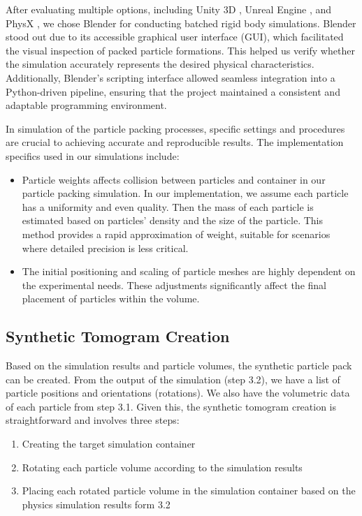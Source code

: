 \documentclass[preprint,12pt]{elsarticle}
\begin{document}
\par
After evaluating multiple options, including Unity 3D \citep{unity2024unity}, Unreal Engine \citep{unreal2024epic}, and PhysX \citep{nvidia2024nvidia}, we chose Blender \citep{blender2023objectops} for conducting batched rigid body simulations. 
Blender stood out due to its accessible graphical user interface (GUI), which facilitated the visual inspection of packed particle formations. 
This helped us verify whether the simulation accurately represents the desired physical characteristics.
Additionally, Blender's scripting interface allowed seamless integration into a Python-driven pipeline, ensuring that the project maintained a consistent and adaptable programming environment.
\par
In simulation of the particle packing processes, specific settings and procedures are crucial to achieving accurate and reproducible results. 
The implementation specifics used in our simulations include:
\begin{itemize}
    \item
    Particle weights affects collision between particles and container in our particle packing simulation. 
    In our implementation, we assume each particle has a uniformity and even quality. 
    Then the mass of each particle is estimated based on particles' density and the size of the particle.
    This method provides a rapid approximation of weight, suitable for scenarios where detailed precision is less critical. 
    \item
    The initial positioning and scaling of particle meshes are highly dependent on the experimental needs. 
    These adjustments significantly affect the final placement of particles within the volume. 
\end{itemize}
\subsection{Synthetic Tomogram Creation}
Based on the simulation results and particle volumes, the synthetic particle pack can be created. 
From the output of the simulation (step 3.2), we have a list of particle positions and orientations (rotations).
We also have the volumetric data of each particle from step 3.1. 
Given this, the synthetic tomogram creation is straightforward and involves three steps:
\begin{enumerate}
    \item Creating the target simulation container
    \item Rotating each particle volume according to the simulation results
    \item Placing each rotated particle volume in the simulation container based on the physics simulation results form 3.2
\end{enumerate}
\end{document}
